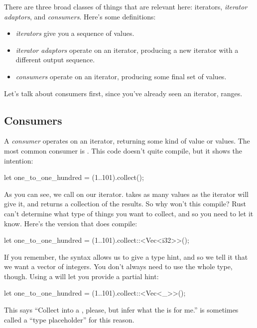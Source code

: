 There are three broad classes of things that are relevant here: iterators, \emph{iterator adaptors}, and \emph{consumers}. Here's 
some definitions:

\begin{itemize}
  \item{\emph{iterators} give you a sequence of values.}
  \item{\emph{iterator adaptors} operate on an iterator, producing a new iterator with a different output sequence.}
  \item{\emph{consumers} operate on an iterator, producing some final set of values.}
\end{itemize}

Let's talk about consumers first, since you've already seen an iterator, ranges.

\subsection*{Consumers}

A \emph{consumer} operates on an iterator, returning some kind of value or values. The most common consumer is . This 
code doesn't quite compile, but it shows the intention:

\begin{rustc}
let one_to_one_hundred = (1..101).collect();
\end{rustc}

As you can see, we call  on our iterator.  takes as many values as the iterator will give it, 
and returns a collection of the results. So why won't this compile? Rust can't determine what type of things you want to collect, 
and so you need to let it know. Here's the version that does compile:

\begin{rustc}
let one_to_one_hundred = (1..101).collect::<Vec<i32>>();
\end{rustc}

If you remember, the \code{::<>} syntax allows us to give a type hint, and so we tell it that we want a vector of integers. You 
don't always need to use the whole type, though. Using a \code{\_} will let you provide a partial hint:

\begin{rustc}
let one_to_one_hundred = (1..101).collect::<Vec<_>>();
\end{rustc}

This says \enquote{Collect into a , please, but infer what the  is for me.} \code{\_} is sometimes called a 
\enquote{type placeholder} for this reason.

